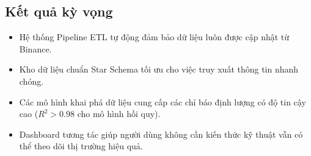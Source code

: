 \subsection{Kết quả kỳ vọng}
\begin{itemize}
    \item Hệ thống Pipeline ETL tự động đảm bảo dữ liệu luôn được cập nhật từ Binance.
    \item Kho dữ liệu chuẩn Star Schema tối ưu cho việc truy xuất thông tin nhanh chóng.
    \item Các mô hình khai phá dữ liệu cung cấp các chỉ báo định lượng có độ tin cậy cao ($R^2 > 0.98$ cho mô hình hồi quy).
    \item Dashboard tương tác giúp người dùng không cần kiến thức kỹ thuật vẫn có thể theo dõi thị trường hiệu quả.
\end{itemize}
